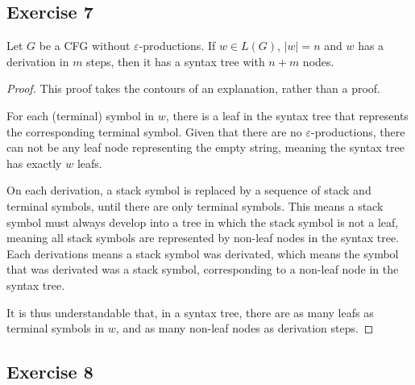 \documentclass[docid=TP08]{tcom_TP}
\begin{document}
{\subsection{Exercise 7}
\begin{theorem}
	Let $G$ be a CFG without $\varepsilon$-productions. If $w \in L(G)$, $|w|=n$ and $w$ has a derivation in $m$ steps, then it has a syntax tree with $n+m$ nodes. 
\end{theorem}
\begin{proof}
This proof takes the contours of an explanation, rather than a proof.\par
For each (terminal) symbol in $w$, there is a leaf in the syntax tree that represents the corresponding terminal symbol. Given that there are no $\varepsilon$-productions, there can not be any leaf node representing the empty string, meaning the syntax tree has exactly $w$ leafs.\par
On each derivation, a stack symbol is replaced by a sequence of stack and terminal symbols, until there are only terminal symbols. This means a stack symbol must always develop into a tree in which the stack symbol is not a leaf, meaning all stack symbols are represented by non-leaf nodes in the syntax tree. Each derivations means a stack symbol was derivated, which means the symbol that was derivated was a stack symbol, corresponding to a non-leaf node in the syntax tree.\par
It is thus understandable that, in a syntax tree, there are as many leafs as terminal symbols in $w$, and as many non-leaf nodes as derivation steps.
\end{proof}
\pagebreak
\subsection{Exercise 8}
}
\end{document}
